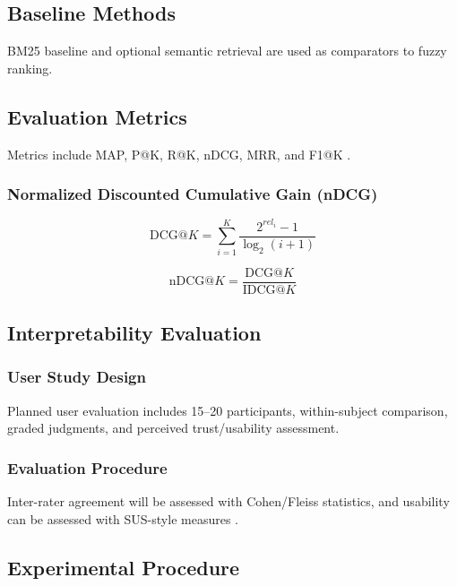\documentclass[11pt,a4paper]{article}
\begin{document}
\subsection{Baseline Methods}

BM25 baseline and optional semantic retrieval are used as comparators to fuzzy ranking.

\subsection{Evaluation Metrics}

Metrics include MAP, P@K, R@K, nDCG, MRR, and F1@K \citep{manning2008,jarvelin2002}.

\subsubsection{Normalized Discounted Cumulative Gain (nDCG)}

\begin{equation}
\mathrm{DCG}@K = \sum_{i=1}^{K} \frac{2^{rel_i}-1}{\log_2(i+1)}
\end{equation}

\begin{equation}
\mathrm{nDCG}@K = \frac{\mathrm{DCG}@K}{\mathrm{IDCG}@K}
\end{equation}

\subsection{Interpretability Evaluation}

\subsubsection{User Study Design}

Planned user evaluation includes 15--20 participants, within-subject comparison, graded judgments, and perceived trust/usability assessment.

\subsubsection{Evaluation Procedure}

Inter-rater agreement will be assessed with Cohen/Fleiss statistics, and usability can be assessed with SUS-style measures \citep{cohen1960,fleiss1971,brooke1996}.

\subsection{Experimental Procedure}
\end{document}
